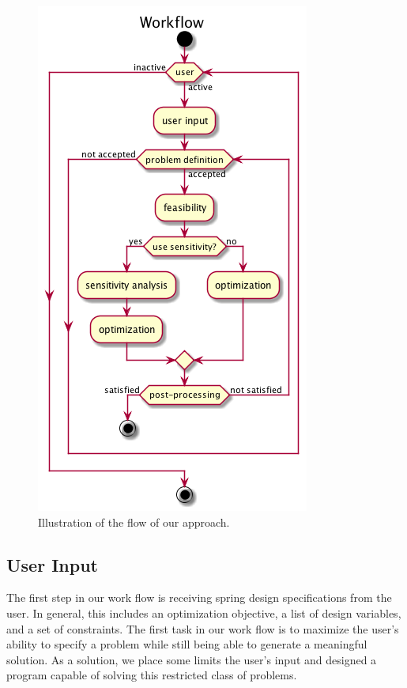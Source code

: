 \documentclass[10pt]{article}
\begin{document}
		\begin{figure}[h!]
		 \begin{center}\includegraphics[scale=.4]{IMSM_Workflow.png}\end{center}
		 \caption{Illustration of the flow of our approach.}
		 \label{Workflow}
		 
		 \end{figure}

\subsection{User Input}
\label{subsec:User_Input}

The first step in our work flow is receiving spring design specifications from the user. In general, this includes an optimization objective, a list of design variables, and a set of constraints. The first task in our work flow is to maximize the user's ability to specify a problem while still being able to generate a meaningful solution. As a solution, we place some limits the user's input and designed a program capable of solving this restricted class of problems.
\end{document}
